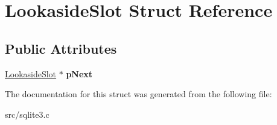 \hypertarget{struct_lookaside_slot}{\section{Lookaside\-Slot Struct Reference}
\label{struct_lookaside_slot}
}
\subsection*{Public Attributes}
\begin{DoxyCompactItemize}
\item 
\hypertarget{struct_lookaside_slot_a3c3dd4a770ded51a68e8a651eba40f66}{\hyperlink{struct_lookaside_slot}{Lookaside\-Slot} $\ast$ {\bfseries p\-Next}}\label{struct_lookaside_slot_a3c3dd4a770ded51a68e8a651eba40f66}

\end{DoxyCompactItemize}


The documentation for this struct was generated from the following file\-:\begin{DoxyCompactItemize}
\item 
src/sqlite3.\-c\end{DoxyCompactItemize}
